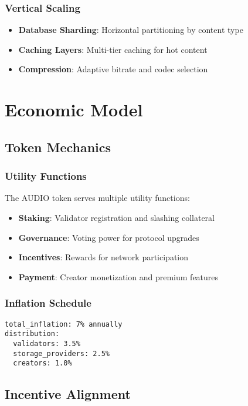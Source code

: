 \documentclass[11pt,a4paper]{article}
\begin{document}
\subsubsection{Vertical Scaling}
\begin{itemize}
  \item \textbf{Database Sharding}: Horizontal partitioning by content type
  \item \textbf{Caching Layers}: Multi-tier caching for hot content
  \item \textbf{Compression}: Adaptive bitrate and codec selection
\end{itemize}

\section{Economic Model}

\subsection{Token Mechanics}

\subsubsection{Utility Functions}
The AUDIO token serves multiple utility functions:

\begin{itemize}
  \item \textbf{Staking}: Validator registration and slashing collateral
  \item \textbf{Governance}: Voting power for protocol upgrades
  \item \textbf{Incentives}: Rewards for network participation
  \item \textbf{Payment}: Creator monetization and premium features
\end{itemize}

\subsubsection{Inflation Schedule}
\begin{lstlisting}[caption=Annual Inflation Distribution]
total_inflation: 7% annually
distribution:
  validators: 3.5%
  storage_providers: 2.5%
  creators: 1.0%
\end{lstlisting}

\subsection{Incentive Alignment}
\end{document}
